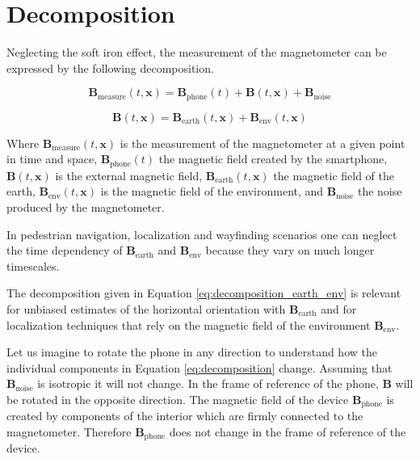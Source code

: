 \section{Decomposition}

Neglecting the soft iron effect, the measurement of the magnetometer can be expressed by the following decomposition.

\begin{equation}
\label{eq:decomposition}
    \bm{B}_\text{measure}(t, \bm{x}) = \bm{B}_\text{phone}(t) + \bm{B}(t, \bm{x}) + \bm{B}_\text{noise}
\end{equation}

\begin{equation}
\label{eq:decomposition_earth_env}
    \bm{B}(t, \bm{x}) = \bm{B}_\text{earth}(t, \bm{x}) + \bm{B}_\text{env}(t, \bm{x})
\end{equation}

Where $\bm{B}_\text{measure}(t, \bm{x})$ is the measurement of the magnetometer at a given point in time and space, $\bm{B}_\text{phone}(t)$ the magnetic field created by the smartphone, $\bm{B}(t, \bm{x})$ is the external magnetic field, $\bm{B}_\text{earth}(t, \bm{x})$ the magnetic field of the earth, $\bm{B}_\text{env}(t, \bm{x})$ is the magnetic field of the environment, and $\bm{B}_\text{noise}$ the noise produced by the magnetometer.

In pedestrian navigation, localization and wayfinding scenarios one can neglect the time dependency of $\bm{B}_\text{earth}$ and $\bm{B}_\text{env}$ because they vary on much longer timescales.

The decomposition given in Equation \ref{eq:decomposition_earth_env} is relevant for unbiased estimates of the horizontal orientation with $\bm{B}_\text{earth}$ and for localization techniques that rely on the magnetic field of the environment $\bm{B}_\text{env}$.

Let us imagine to rotate the phone in any direction to understand how the individual components in Equation \ref{eq:decomposition} change. Assuming that $\bm{B}_\text{noise}$ is isotropic it will not change. In the frame of reference of the phone, $\bm{B}$ will be rotated in the opposite direction. The magnetic field of the device $\bm{B}_\text{phone}$ is created by components of the interior which are firmly connected to the magnetometer. Therefore $\bm{B}_\text{phone}$ does not change in the frame of reference of the device.

